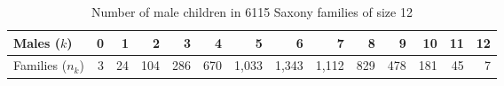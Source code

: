 \begin{table}[t]
\caption{Number of male children in 6115 Saxony families of size 12} \label{tab:saxtab}
\centering
\begin{tabular}{l|rrrrrrrrrrrrr}
  \hline
Males ($k$) & 0 & 1 & 2 & 3 & 4 & 5 & 6 & 7 & 8 & 9 & 10 & 11 & 12 \\ 
  \hline
Families ($n_k$) & 3 & 24 & 104 & 286 & 670 & 1,033 & 1,343 & 1,112 & 829 & 478 & 181 & 45 & 7  \\ 
   \hline
\end{tabular}
\end{table}
 
